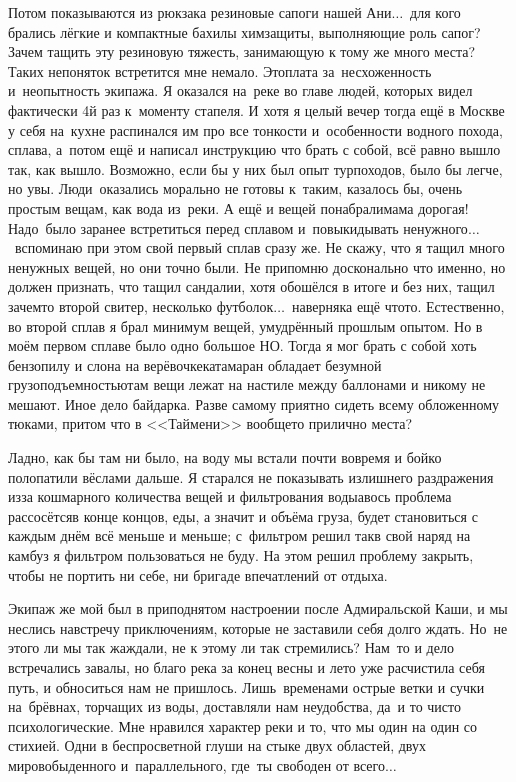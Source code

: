 Потом показываются из рюкзака резиновые сапоги нашей Ани$\ldots$~для кого брались лёгкие и компактные бахилы химзащиты, выполняющие роль сапог? Зачем тащить эту резиновую тяжесть, занимающую к тому же много места? Таких непоняток встретится мне немало. Это\mdash плата за~несхоженность и~неопытность экипажа. Я оказался на~реке во главе людей, которых видел фактически 4\sdash й раз к~моменту стапеля. И хотя я целый вечер тогда ещё в Москве у себя на~кухне распинался им про все тонкости и~особенности водного похода, сплава, а~потом ещё и написал инструкцию что брать с собой, всё равно вышло так, как вышло. Возможно, если бы у них был опыт турпоходов, было бы легче, но увы. Люди~оказались морально не готовы к~таким, казалось бы, очень простым вещам, как вода из~реки. А ещё и вещей понабрали\mdash мама дорогая! Надо~было заранее встретиться перед сплавом и~повыкидывать ненужного$\ldots$~вспоминаю при этом свой первый сплав сразу же. Не скажу, что я тащил много ненужных вещей, но они точно были. Не припомню досконально что именно, но должен признать, что тащил сандалии, хотя обошёлся в итоге и без них, тащил зачем\sdash то второй свитер, несколько футболок$\ldots$~наверняка ещё что\sdash то. Естественно, во второй сплав я брал минимум вещей, умудрённый прошлым опытом. Но в моём первом сплаве было одно большое НО. Тогда я мог брать с собой хоть бензопилу и слона на верёвочке\mdash катамаран обладает безумной грузоподъемностью\mdash там вещи лежат на настиле между баллонами и никому не мешают. Иное дело байдарка. Разве самому приятно сидеть всему обложенному тюками, притом что в <<Таймени>> вообще\sdash то прилично места? 

Ладно, как бы там ни было, на воду мы встали почти вовремя и бойко полопатили вёслами дальше. Я старался не показывать излишнего раздражения из\sdash за кошмарного количества вещей и фильтрования воды\mdash авось проблема рассосётся\mdash в конце концов, еды, а значит и объёма груза, будет становиться с каждым днём всё меньше и меньше; с~фильтром решил так\mdash в свой наряд на камбуз я фильтром пользоваться не буду. На этом решил проблему закрыть, чтобы не портить ни себе, ни бригаде впечатлений от отдыха.

Экипаж же мой был в приподнятом настроении после Адмиральской Каши, и мы неслись навстречу приключениям, которые не заставили себя долго ждать. Но~не этого ли мы так жаждали, не к этому ли так стремились? Нам~то и дело встречались завалы, но благо река за конец весны и лето уже расчистила себя путь, и обноситься нам не пришлось. Лишь~временами острые ветки и сучки на~брёвнах, торчащих из воды, доставляли нам неудобства, да~и то чисто психологические. Мне нравился характер реки и то, что мы один на один со стихией. Одни в беспросветной глуши на стыке двух областей, двух миров\mdash обыденного и~параллельного, где~ты свободен от всего$\ldots$

